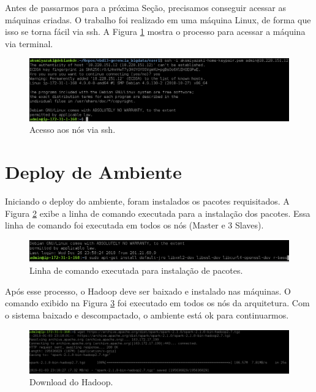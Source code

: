 \documentclass{article}
\begin{document}
Antes de passarmos para a próxima Seção, precisamos conseguir acessar as máquinas criadas. O trabalho foi realizado
em uma máquina Linux, de forma que isso se torna fácil via ssh. A Figura \ref{fig:machine_access} mostra o processo para acessar a máquina via terminal.

\begin{figure}[h]
  \includegraphics[width=\linewidth]{img/machine_access.png}
  \caption{Acesso aos nós via ssh.}
  \label{fig:machine_access}
\end{figure}

\section{Deploy de Ambiente}

Iniciando o deploy do ambiente, foram instalados os pacotes requisitados. A Figura \ref{fig:package_install} exibe a linha de comando executada
para a instalação dos pacotes. Essa linha de comando foi executada em todos os nós (Master e 3 Slaves).

\begin{figure}[h]
  \includegraphics[width=\linewidth]{img/package_install.png}
  \caption{Linha de comando executada para instalação de pacotes.}
  \label{fig:package_install}
\end{figure}

Após esse processo, o Hadoop deve ser baixado e instalado nas máquinas. O comando exibido na Figura \ref{fig:hadoop_dl} foi executado em todos os nós da arquitetura.
Com o sistema baixado e descompactado, o ambiente está ok para continuarmos.

\begin{figure}[h]
  \includegraphics[width=\linewidth]{img/hadoop_download.png}
  \caption{Download do Hadoop.}
  \label{fig:hadoop_dl}
\end{figure}
\end{document}
